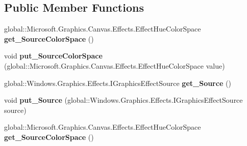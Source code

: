 \subsection*{Public Member Functions}
\begin{DoxyCompactItemize}
\item 
\mbox{\label{interface_microsoft_1_1_graphics_1_1_canvas_1_1_effects_1_1_i_hue_to_rgb_effect_a8962ee09b8e43d2cfb870b6a526a9c3e}} 
global\+::\+Microsoft.\+Graphics.\+Canvas.\+Effects.\+Effect\+Hue\+Color\+Space {\bfseries get\+\_\+\+Source\+Color\+Space} ()
\item 
\mbox{\label{interface_microsoft_1_1_graphics_1_1_canvas_1_1_effects_1_1_i_hue_to_rgb_effect_a2764dc581ffb4eb37255a16155b58807}} 
void {\bfseries put\+\_\+\+Source\+Color\+Space} (global\+::\+Microsoft.\+Graphics.\+Canvas.\+Effects.\+Effect\+Hue\+Color\+Space value)
\item 
\mbox{\label{interface_microsoft_1_1_graphics_1_1_canvas_1_1_effects_1_1_i_hue_to_rgb_effect_a0d8641879596727e5f250feac4374dd2}} 
global\+::\+Windows.\+Graphics.\+Effects.\+I\+Graphics\+Effect\+Source {\bfseries get\+\_\+\+Source} ()
\item 
\mbox{\label{interface_microsoft_1_1_graphics_1_1_canvas_1_1_effects_1_1_i_hue_to_rgb_effect_a10be0ca9703e99422fcc7c71468e80e3}} 
void {\bfseries put\+\_\+\+Source} (global\+::\+Windows.\+Graphics.\+Effects.\+I\+Graphics\+Effect\+Source source)
\item 
\mbox{\label{interface_microsoft_1_1_graphics_1_1_canvas_1_1_effects_1_1_i_hue_to_rgb_effect_a8962ee09b8e43d2cfb870b6a526a9c3e}} 
global\+::\+Microsoft.\+Graphics.\+Canvas.\+Effects.\+Effect\+Hue\+Color\+Space {\bfseries get\+\_\+\+Source\+Color\+Space} ()
\item 
\mbox{\label{interface_microsoft_1_1_graphics_1_1_canvas_1_1_effects_1_1_i_hue_to_rgb_effect_a2764dc581ffb4eb37255a16155b58807}} 

\end{DoxyCompactItemize}
